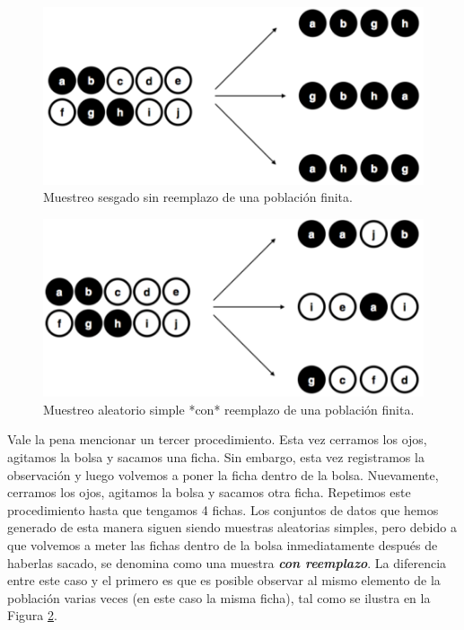 \documentclass[spanish,]{book}
\begin{document}
\begin{figure}
\includegraphics[width=12.81in]{img/estimation/brs} \caption{Muestreo sesgado sin reemplazo de una población finita.}\label{fig:brs}
\end{figure}

\begin{figure}
\includegraphics[width=12.94in]{img/estimation/srs2} \caption{Muestreo aleatorio simple *con* reemplazo de una población finita.}\label{fig:srs2}
\end{figure}

Vale la pena mencionar un tercer procedimiento. Esta vez cerramos los
ojos, agitamos la bolsa y sacamos una ficha. Sin embargo, esta vez
registramos la observación y luego volvemos a poner la ficha dentro de
la bolsa. Nuevamente, cerramos los ojos, agitamos la bolsa y sacamos
otra ficha. Repetimos este procedimiento hasta que tengamos 4 fichas.
Los conjuntos de datos que hemos generado de esta manera siguen siendo
muestras aleatorias simples, pero debido a que volvemos a meter las
fichas dentro de la bolsa inmediatamente después de haberlas sacado, se
denomina como una muestra \textbf{\emph{con reemplazo}}. La diferencia
entre este caso y el primero es que es posible observar al mismo
elemento de la población varias veces (en este caso la misma ficha), tal
como se ilustra en la Figura \ref{fig:srs2}.
\end{document}

